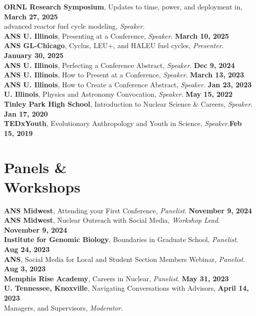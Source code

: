 \documentclass[margin,line]{resume}
\begin{document}
\begin{resume}
    \textbf{ORNL Research Symposium}, Updates to time, power, and deployment in,  \hfill\textbf{March 27, 2025}\\
    advanced reactor fuel cycle modeling, \emph{Speaker}.\\
    \textbf{ANS U. Illinois}, Presenting at a Conference, \emph{Speaker}.  \hfill\textbf{March 10, 2025}\\
    \textbf{ANS GL-Chicago}, Cyclus, LEU+, and HALEU fuel cycles, \emph{Presenter}.  \hfill\textbf{January 30, 2025}\\
    \textbf{ANS U. Illinois}, Perfecting a Conference Abstract, \emph{Speaker}.  \hfill\textbf{Dec 9, 2024}\\
    \textbf{ANS U. Illinois}, How to Present at a Conference, \emph{Speaker}.  \hfill\textbf{March 13, 2023}\\
    \textbf{ANS U. Illinois}, How to Create a Conference Abstract, \emph{Speaker}.  \hfill\textbf{Jan 23, 2023}\\
    \textbf{U. Illinois}, Physics and Astronomy Convocation, \emph{Speaker}.  \hfill\textbf{May 15, 2022}\\
    \textbf{Tinley Park High School}, Introduction to Nuclear Science \& Careers, \emph{Speaker}.  \hfill\textbf{Jan 17, 2020}\\
    \textbf{TEDxYouth}, Evolutionary Anthropology and Youth in Science, \emph{Speaker}.\hfill\textbf{Feb 15, 2019}\\

    \section{\mysidestyle Panels \&\\Workshops}

    \textbf{ANS Midwest}, Attending your First Conference, \emph{Panelist}.  \hfill\textbf{November 9, 2024}\\
    \textbf{ANS Midwest}, Nuclear Outreach with Social Media, \emph{Workshop Lead}.  \hfill\textbf{November 9, 2024}\\
    \textbf{Institute for Genomic Biology}, Boundaries in Graduate School, \emph{Panelist}. \hfill \textbf{Aug 24, 2023}\\
    \textbf{ANS}, Social Media for Local and Student Section Members Webinar, \emph{Panelist}. \hfill\textbf{Aug 3, 2023}\\
    \textbf{Memphis Rise Academy}, Careers in Nuclear, \emph{Panelist}. \hfill\textbf{May 31, 2023}\\
    \textbf{U. Tennessee, Knoxville}, Navigating Conversations with Advisors,  \hfill\textbf{April 14, 2023}\\
    Managers, and Supervisors, \emph{Moderator}.\\


\end{resume}
\end{document}
